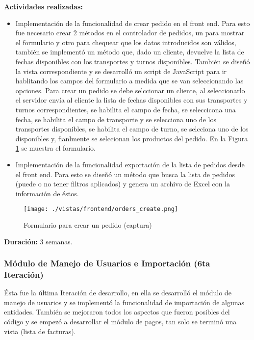 \vspace{0.3cm}
\textbf{Actividades realizadas:}
\begin{itemize}
    \item Implementación de la funcionalidad de crear pedido en el front end. Para esto fue necesario crear 2 métodos en el controlador de pedidos, un para mostrar el formulario y otro para chequear que los datos introducidos son válidos, también se implementó un método que, dado un cliente, devuelve la lista de fechas disponibles con los transportes y turnos disponibles. También se diseñó la vista correspondiente y se desarrolló un script de JavaScript para ir hablitando los campos del formulario a medida que se van seleccionando las opciones. Para crear un pedido se debe selccionar un cliente, al seleccionarlo el servidor envía al cliente la lista de fechas disponibles con sus transportes y turnos correspondientes, se habilita el campo de fecha, se seleccicona una fecha, se habilita el campo de transporte y se selecciona uno de los transportes disponibles, se habilita el campo de turno, se selcciona uno de los disponibles y, fianlmente se selccionan los productos del pedido. En la Figura \ref{fig:ordercreate} se muestra el formulario.
    \item Implementación de la funcionalidad exportación de la lista de pedidos desde el front end. Para esto se diseñó un método que busca la lista de pedidos (puede o no tener filtros aplicados) y genera un archivo de Excel con la información de éstos.
\end{itemize}

\begin{figure}[H]
    \centering
    \texttt{[image: ./vistas/frontend/orders\_create.png]}
    \caption{Formulario para crear un pedido (captura)}
    \label{fig:ordercreate}
\end{figure}

\textbf{Duración:} 3 semanas.

\subsubsection{Módulo de Manejo de Usuarios e Importación (6ta Iteración)}
Ésta fue la última Iteración de desarrollo, en ella se desarrolló el módulo de manejo de usuarios y se implementó la funcionalidad de importación de algunas entidades. También se mejoraron todos los aspectos que fueron posibles del código y se empezó a desarrollar el módulo de pagos, tan solo se terminó una vista (lista de facturas).

